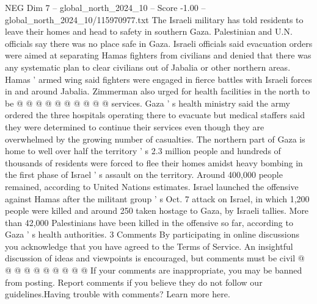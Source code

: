 \begin{textsample}{NEG Dim 7 – global\_north\_2024\_10 – Score -1.00 – global\_north\_2024\_10/115970977.txt}
The Israeli military has told residents to leave their homes and head to safety in southern Gaza.
Palestinian and U.N. officials say there was no place safe in Gaza.
Israeli officials said evacuation orders were aimed at separating Hamas fighters from civilians and denied that there was any systematic plan to clear civilians out of Jabalia or other northern areas.
Hamas ' armed wing said fighters were engaged in fierce battles with Israeli forces in and around Jabalia.
Zimmerman also urged for health facilities in the north to be @ @ @ @ @ @ @ @ @ @ services.
Gaza ' s health ministry said the army ordered the three hospitals operating there to evacuate but medical staffers said they were determined to continue their services even though they are overwhelmed by the growing number of casualties.
The northern part of Gaza is home to well over half the territory ' s 2.3 million people and hundreds of thousands of residents were forced to flee their homes amidst heavy bombing in the first phase of Israel ' s assault on the territory.
Around 400,000 people remained, according to United Nations estimates.
Israel launched the offensive against Hamas after the militant group ' s Oct. 7 attack on Israel, in which 1,200 people were killed and around 250 taken hostage to Gaza, by Israeli tallies.
More than 42,000 Palestinians have been killed in the offensive so far, according to Gaza ' s health authorities. 3 Comments By participating in online discussions you acknowledge that you have agreed to the Terms of Service.
An insightful discussion of ideas and viewpoints is encouraged, but comments must be civil @ @ @ @ @ @ @ @ @ @ If your comments are inappropriate, you may be banned from posting.
Report comments if you believe they do not follow our guidelines.Having trouble with comments?
Learn more here.

\end{textsample}
